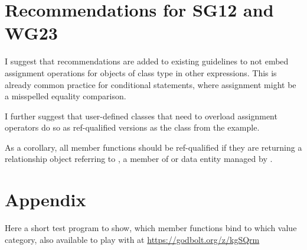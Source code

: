\documentclass[ebook,11pt,article]{memoir}
\begin{document}
\chapter{Recommendations for SG12 and WG23}

I suggest that recommendations are added to existing guidelines to not embed assignment operations for objects of class type in other expressions. 
This is already common practice for conditional statements, where assignment might be a misspelled equality comparison.

I further suggest that user-defined classes that need to overload assignment operators do so as ref-qualified versions as the  class from the example.

As a corollary, all member functions should be ref-qualified if they are returning a relationship object referring to , a member of or data entity managed by .

\chapter{Appendix}

Here a short test program to show, which member functions bind to which value category, also available to play with at \url{https://godbolt.org/z/kgSQrm}
\end{document}
